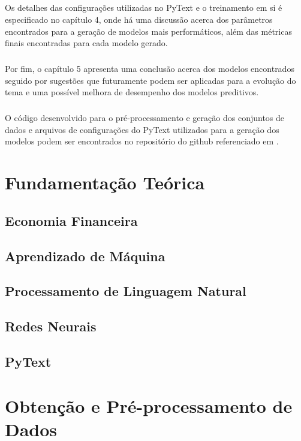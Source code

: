 \documentclass[grad,numbers]{coppe}
\begin{document}
			\paragraph{}Os detalhes das configurações utilizadas no PyText e o treinamento em si é especificado no capítulo 4, onde há uma discussão acerca dos parâmetros encontrados para a geração de modelos mais performáticos, além das métricas finais encontradas para cada modelo gerado.
			\paragraph{}Por fim, o capítulo 5 apresenta uma conclusão acerca dos modelos encontrados seguido por sugestões que futuramente podem ser aplicadas para a evolução do tema e uma possível melhora de desempenho dos modelos preditivos.
			\paragraph{}O código desenvolvido para o pré-processamento e geração dos conjuntos de dados e arquivos de configurações do PyText utilizados para a geração dos modelos podem ser encontrados no repositório do github referenciado em \cite{github}.
   
  \chapter{Fundamentação Teórica}
  
  \section{Economia Financeira}
  \section{Aprendizado de Máquina}
  \section{Processamento de Linguagem Natural}
  \section{Redes Neurais}
  \section{PyText}
  
  \chapter{Obtenção e Pré-processamento de Dados}
  
\end{document}
